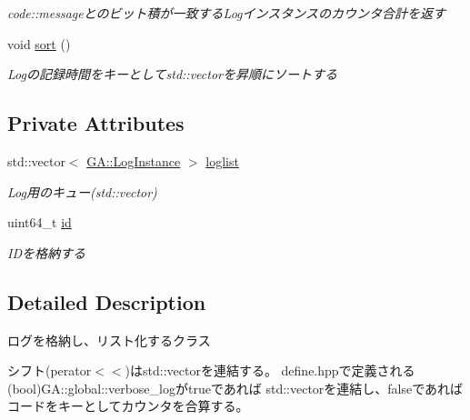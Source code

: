 \begin{DoxyCompactItemize}
\begin{DoxyCompactList}\small\item\em code\+::messageとのビット積が一致する\+Logインスタンスのカウンタ合計を返す \end{DoxyCompactList}\item 
\mbox{\label{class_log_queue_ab026255ea635d81b101f0d89f27d7afd}} 
void \mbox{\hyperlink{class_log_queue_ab026255ea635d81b101f0d89f27d7afd}{sort}} ()
\begin{DoxyCompactList}\small\item\em Logの記録時間をキーとしてstd\+::vectorを昇順にソートする \end{DoxyCompactList}\end{DoxyCompactItemize}
\subsection*{Private Attributes}
\begin{DoxyCompactItemize}
\item 
\mbox{\label{class_log_queue_a6366d0b9ed5268d9e14c0d251a207bce}} 
std\+::vector$<$ \mbox{\hyperlink{class_g_a_1_1_log_instance}{G\+A\+::\+Log\+Instance}} $>$ \mbox{\hyperlink{class_log_queue_a6366d0b9ed5268d9e14c0d251a207bce}{loglist}}
\begin{DoxyCompactList}\small\item\em Log用のキュー(std\+::vector) \end{DoxyCompactList}\item 
\mbox{\label{class_log_queue_ab9253dce534aa882b15b6c92bc8a3056}} 
uint64\+\_\+t \mbox{\hyperlink{class_log_queue_ab9253dce534aa882b15b6c92bc8a3056}{id}}
\begin{DoxyCompactList}\small\item\em I\+Dを格納する \end{DoxyCompactList}\end{DoxyCompactItemize}


\subsection{Detailed Description}
ログを格納し、リスト化するクラス 

シフト(perator$<$$<$)はstd\+::vectorを連結する。 define.\+hppで定義される(bool)G\+A\+::global\+::verbose\+\_\+logがtrueであれば std\+::vectorを連結し、falseであればコードをキーとしてカウンタを合算する。 

